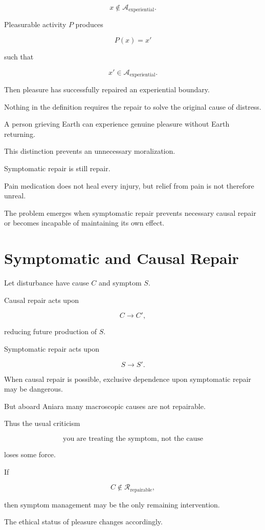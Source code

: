 \documentclass[11pt,oneside]{book}
\theoremstyle{definition}
\theoremstyle{remark}
\newcommand{\A}{\mathcal{A}}
\newcommand{\R}{\mathcal{R}}
\begin{document}
\[
x\notin\A_{\mathrm{experiential}}.
\]

Pleasurable activity \(P\) produces

\[
P(x)=x'
\]

such that

\[
x'\in\A_{\mathrm{experiential}}.
\]

Then pleasure has successfully repaired an experiential boundary.

Nothing in the definition requires the repair to solve the original cause of distress.

A person grieving Earth can experience genuine pleasure without Earth returning.

This distinction prevents an unnecessary moralization.

Symptomatic repair is still repair.

Pain medication does not heal every injury, but relief from pain is not therefore unreal.

The problem emerges when symptomatic repair prevents necessary causal repair or becomes incapable of maintaining its own effect.

\section{Symptomatic and Causal Repair}

Let disturbance have cause \(C\) and symptom \(S\).

Causal repair acts upon

\[
C\rightarrow C',
\]

reducing future production of \(S\).

Symptomatic repair acts upon

\[
S\rightarrow S'.
\]

When causal repair is possible, exclusive dependence upon symptomatic repair may be dangerous.

But aboard Aniara many macroscopic causes are not repairable.

Thus the usual criticism

\[
\text{you are treating the symptom, not the cause}
\]

loses some force.

If

\[
C\notin\R_{\mathrm{repairable}},
\]

then symptom management may be the only remaining intervention.

The ethical status of pleasure changes accordingly.
\end{document}
